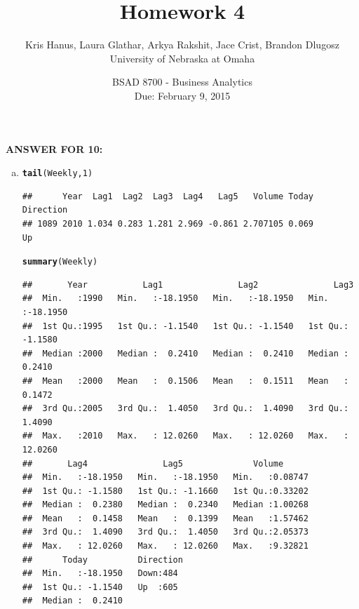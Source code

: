 \documentclass{article}\usepackage[]{graphicx}\usepackage[]{color}
\makeatletter
\newcommand{\hlnum}[1]{\textcolor[rgb]{0.686,0.059,0.569}{#1}}%
\newcommand{\hlstd}[1]{\textcolor[rgb]{0.345,0.345,0.345}{#1}}%
\newcommand{\hlkwd}[1]{\textcolor[rgb]{0.737,0.353,0.396}{\textbf{#1}}}%
\newenvironment{kframe}{%
 \def\at@end@of@kframe{}%
 \ifinner\ifhmode%
  \def\at@end@of@kframe{\end{minipage}}%
  \begin{minipage}{\columnwidth}%
 \fi\fi%
 \def\FrameCommand##1{\hskip\@totalleftmargin \hskip-\fboxsep
 \colorbox{shadecolor}{##1}\hskip-\fboxsep
     \hskip-\linewidth \hskip-\@totalleftmargin \hskip\columnwidth}%
 \MakeFramed {\advance\hsize-\width
   \@totalleftmargin\z@ \linewidth\hsize
   \@setminipage}}%
 {\par\unskip\endMakeFramed%
 \at@end@of@kframe}
\newenvironment{knitrout}{}{} %
\makeatother
\begin{document}
\title{Homework 4}
\date{BSAD 8700 - Business Analytics\\ Due: February 9, 2015}
\author{Kris Hanus, Laura Glathar, Arkya Rakshit, Jace Crist, Brandon Dlugosz\\ University of Nebraska at Omaha}
\maketitle

\textbf{ANSWER FOR 10:} \\



\begin{enumerate}[(a)]
\item
\begin{knitrout}
\color{fgcolor}\begin{kframe}
\begin{alltt}
\hlkwd{tail}\hlstd{(Weekly,} \hlnum{1}\hlstd{)}
\end{alltt}
\begin{verbatim}
##      Year  Lag1  Lag2  Lag3  Lag4   Lag5   Volume Today Direction
## 1089 2010 1.034 0.283 1.281 2.969 -0.861 2.707105 0.069        Up
\end{verbatim}
\begin{alltt}
\hlkwd{summary}\hlstd{(Weekly)}
\end{alltt}
\begin{verbatim}
##       Year           Lag1               Lag2               Lag3         
##  Min.   :1990   Min.   :-18.1950   Min.   :-18.1950   Min.   :-18.1950  
##  1st Qu.:1995   1st Qu.: -1.1540   1st Qu.: -1.1540   1st Qu.: -1.1580  
##  Median :2000   Median :  0.2410   Median :  0.2410   Median :  0.2410  
##  Mean   :2000   Mean   :  0.1506   Mean   :  0.1511   Mean   :  0.1472  
##  3rd Qu.:2005   3rd Qu.:  1.4050   3rd Qu.:  1.4090   3rd Qu.:  1.4090  
##  Max.   :2010   Max.   : 12.0260   Max.   : 12.0260   Max.   : 12.0260  
##       Lag4               Lag5              Volume       
##  Min.   :-18.1950   Min.   :-18.1950   Min.   :0.08747  
##  1st Qu.: -1.1580   1st Qu.: -1.1660   1st Qu.:0.33202  
##  Median :  0.2380   Median :  0.2340   Median :1.00268  
##  Mean   :  0.1458   Mean   :  0.1399   Mean   :1.57462  
##  3rd Qu.:  1.4090   3rd Qu.:  1.4050   3rd Qu.:2.05373  
##  Max.   : 12.0260   Max.   : 12.0260   Max.   :9.32821  
##      Today          Direction 
##  Min.   :-18.1950   Down:484  
##  1st Qu.: -1.1540   Up  :605  
##  Median :  0.2410             

\end{verbatim}
\end{kframe}
\end{knitrout}
\end{enumerate}
\end{document}
